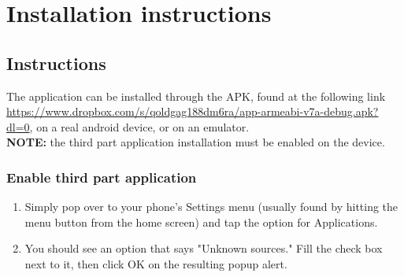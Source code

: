 \chapter{Installation instructions}

\section{Instructions}
The application can be installed through the APK, found at the following link \url{https://www.dropbox.com/s/qoldgag188dm6ra/app-armeabi-v7a-debug.apk?dl=0}, on a real android device, or on an emulator.\\
\textbf{NOTE:} the third part application installation must be enabled on the device.

\subsection{Enable third part application}
\begin{enumerate}
\item Simply pop over to your phone's Settings menu (usually found by hitting the menu button from the home screen) and tap the option for Applications.
\item You should see an option that says "Unknown sources." Fill the check box next to it, then click OK on the resulting popup alert.
\end{enumerate}